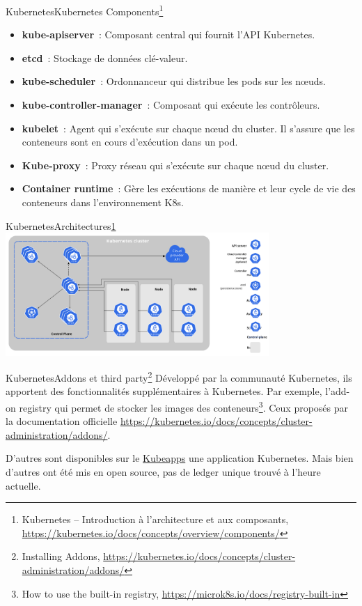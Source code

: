 \documentclass{beamer}
\begin{document}
    \begin{frame}{Kubernetes}{Kubernetes Components\footnote{\label{k8scompnents}Kubernetes – Introduction à l’architecture et aux composants, \url{https://kubernetes.io/docs/concepts/overview/components/}}}
        \begin{itemize}
            \item \textbf{kube-apiserver}~: Composant central qui fournit l'API Kubernetes.
            \item \textbf{etcd}~: Stockage de données clé-valeur.
            \item \textbf{kube-scheduler}~: Ordonnanceur qui distribue les pods sur les nœuds.
            \item \textbf{kube-controller-manager}~: Composant qui exécute les contrôleurs.
            \item \textbf{kubelet}~: Agent qui s'exécute sur chaque nœud du cluster.
            Il s'assure que les conteneurs sont en cours d'exécution dans un pod.
            \item \textbf{Kube-proxy}~: Proxy réseau qui s'exécute sur chaque nœud du cluster.
            \item \textbf{Container runtime}~: Gère les exécutions de manière  et leur cycle de vie des conteneurs dans l'environnement K8s.
        \end{itemize}
    \end{frame}

    \begin{frame}{Kubernetes}{Architectures\cref{k8scompnents}}
        \centering
        \includegraphics[width=10cm]{image/components-of-kubernetes}
    \end{frame}

    \begin{frame}{Kubernetes}{Addons et third party\footnote{Installing Addons, \url{https://kubernetes.io/docs/concepts/cluster-administration/addons/}}}
        Développé par la communauté Kubernetes, ils apportent des fonctionnalités supplémentaires à Kubernetes.
        Par exemple, l'add-on registry qui permet de stocker les images des conteneurs\footnote{How to use the built-in registry, \url{https://microk8s.io/docs/registry-built-in}}.
        \bigbreak
        Ceux proposés par la documentation officielle \url{https://kubernetes.io/docs/concepts/cluster-administration/addons/}.

        D'autres sont disponibles sur le \href{https://hub.kubeapps.com/}{Kubeapps} une application Kubernetes.
        \bigbreak
        Mais bien d'autres ont été mis en open source, pas de ledger unique trouvé à l'heure actuelle.
    \end{frame}
\end{document}
